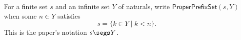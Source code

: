 \begin{definition}
For a finite set $s$ and an infinite set $Y$ of naturals, write
$\mathsf{ProperPrefixSet}(s,Y)$ when some $n\in Y$ satisfies
\[
s=\{k\in Y\mid k<n\}.
\]
This is the paper's notation $s\segs Y$.
\end{definition}
